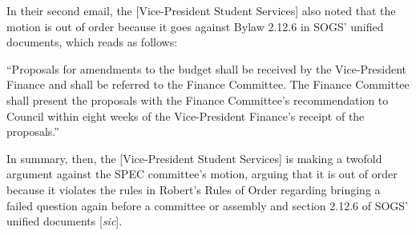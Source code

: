 \begin{multicols}{2}
In their second email, the [Vice-President Student Services] also noted that the motion is out of order because it goes against Bylaw 2.12.6 in SOGS' unified documents, which reads as follows:
\begin{small}
	\begin{center}
		\begin{minipage}{0.8\linewidth}
			``Proposals for amendments to the budget shall be received by the Vice-President Finance and shall be referred to the Finance Committee. The Finance Committee shall present the proposals with the Finance Committee's recommendation to Council within eight weeks of the Vice-President Finance's receipt of the proposals.''
		\end{minipage}
	\end{center}
\end{small}
In summary, then, the [Vice-President Student Services] is making a twofold argument against the SPEC committee's motion, arguing that it is out of order because it violates the rules in Robert's Rules of Order regarding bringing a failed question again before a committee or assembly and section 2.12.6 of SOGS' unified documents [\emph{sic}].


\end{multicols}

